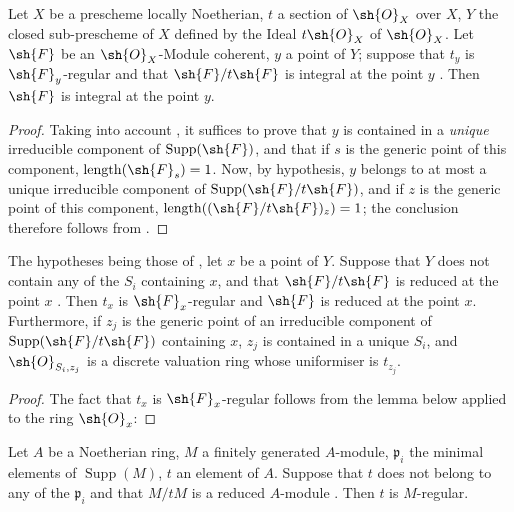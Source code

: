 \begin{proposition}[3.4.5]
\label{IV.3.4.5}
Let $X$ be a prescheme locally Noetherian, $t$ a section of $\sh{O}_X$ over $X$, $Y$ the closed sub-prescheme of $X$ defined by the Ideal $t\sh{O}_X$ of $\sh{O}_X$.
Let $\sh{F}$ be an $\sh{O}_X$-Module coherent, $y$ a point of $Y$; suppose that $t_y$ is $\sh{F}_y$-regular and that $\sh{F}/t\sh{F}$ is integral at the point $y$ .
Then $\sh{F}$ is integral at the point $y$.
\end{proposition}

\begin{proof}
Taking into account , it suffices to prove that $y$ is contained in a \emph{unique} irreducible component of $\operatorname{Supp}(\sh{F})$, and that if $s$ is the generic point of this component, $\operatorname{length}(\sh{F}_s)=1$.
Now, by hypothesis, $y$ belongs to at most a unique irreducible component of $\operatorname{Supp}(\sh{F}/t\sh{F})$, and if $z$ is the generic point of this component, $\operatorname{length}((\sh{F}/t\sh{F})_z)=1$; the conclusion therefore follows from .
\end{proof}

\begin{proposition}[3.4.6]
\label{IV.3.4.6}
The hypotheses being those of , let $x$ be a point of $Y$.
Suppose that $Y$ does not contain any of the $S_i$ containing $x$, and that $\sh{F}/t\sh{F}$ is reduced at the point $x$ .
Then $t_x$ is $\sh{F}_x$-regular and $\sh{F}$ is reduced at the point $x$.
Furthermore, if $z_j$ is the generic point of an irreducible component of $\operatorname{Supp}(\sh{F}/t\sh{F})$ containing $x$, $z_j$ is contained in a unique $S_i$, and $\sh{O}_{S_i,z_j}$ is a discrete valuation ring whose uniformiser is $t_{z_j}$.
\end{proposition}

\begin{proof}
The fact that $t_x$ is $\sh{F}_x$-regular follows from the lemma below applied to the ring $\sh{O}_x$:
\end{proof}

\begin{lemma}[3.4.6.1]
\label{IV.3.4.6.1}
Let $A$ be a Noetherian ring, $M$ a finitely generated $A$-module, $\mathfrak{p}_i$ the minimal elements of $\operatorname{Supp}(M)$, $t$ an element of $A$.
Suppose that $t$ does not belong to any of the $\mathfrak{p}_i$ and that $M/tM$ is a reduced $A$-module .
Then $t$ is $M$-regular.
\end{lemma}

